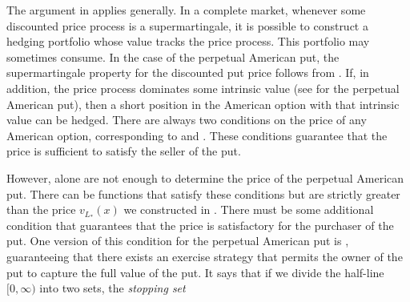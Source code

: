 The argument in  applies generally. In a complete market, whenever some discounted price process is a supermartingale, it is possible to construct a hedging portfolio whose value tracks the price process. This portfolio may sometimes consume. In the case of the perpetual American put, the supermartingale property for the discounted put price follows from . If, in addition, the price process dominates some intrinsic value (see  for the perpetual American put), then a short position in the American option with that intrinsic value can be hedged. There are always two conditions on the price of any American option, corresponding to  and . These conditions guarantee that the price is sufficient to satisfy the seller of the put.

However,  alone are not enough to determine the price of the perpetual American put. There can be functions that satisfy these conditions but are strictly greater than the price \(v_{L_*}(x)\) we constructed in . There must be some additional condition that guarantees that the price is satisfactory for the purchaser of the put. One version of this condition for the perpetual American put is , guaranteeing that there exists an exercise strategy that permits the owner of the put to capture the full value of the put. It says that if we divide the half-line \([0,\infty)\) into two sets, the \textit{stopping set}

